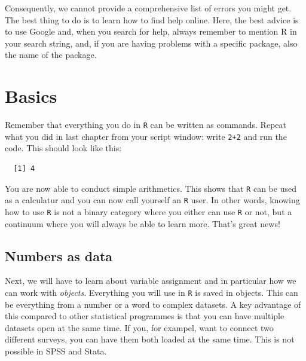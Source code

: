 \documentclass[12pt,oneside]{reedthesis}
\theoremstyle{definition}
\theoremstyle{definition}
\theoremstyle{definition}
\theoremstyle{remark}
\begin{document}
  Consequently, we cannot provide a comprehensive list of errors you might
  get. The best thing to do is to learn how to find help online. Here, the
  best advice is to use Google and, when you search for help, always
  remember to mention R in your search string, and, if you are having
  problems with a specific package, also the name of the package.
  
  \chapter{Basics}\label{basics}
  
  Remember that everything you do in \texttt{R} can be written as
  commands. Repeat what you did in last chapter from your script window:
  write \texttt{2+2} and run the code. This should look like this:
  \begin{Shaded}
  \begin{Highlighting}[]
  \OperatorTok{+}
  \end{Highlighting}
  \end{Shaded}
  \begin{verbatim}
  [1] 4
  \end{verbatim}
  You are now able to conduct simple arithmetics. This shows that
  \texttt{R} can be used as a calculatur and you can now call yourself an
  \texttt{R} user. In other words, knowing how to use \texttt{R} is not a
  binary category where you either can use \texttt{R} or not, but a
  continuum where you will always be able to learn more. That's great
  news!
  
  \section{Numbers as data}\label{numbers-as-data}
  
  Next, we will have to learn about variable assignment and in particular
  how we can work with \emph{objects}. Everything you will use in
  \texttt{R} is saved in objects. This can be everything from a number or
  a word to complex datasets. A key advantage of this compared to other
  statistical programmes is that you can have multiple datasets open at
  the same time. If you, for exampel, want to connect two different
  surveys, you can have them both loaded at the same time. This is not
  possible in SPSS and Stata.
  
\end{document}
